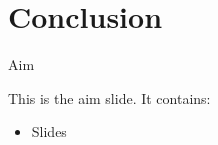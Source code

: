 \section{Conclusion}

    \begin{frame}{Aim}
    
        This is the aim slide.
        It contains:
        
        \begin{itemize}
        \item Slides
        \end{itemize}
        
    \end{frame}